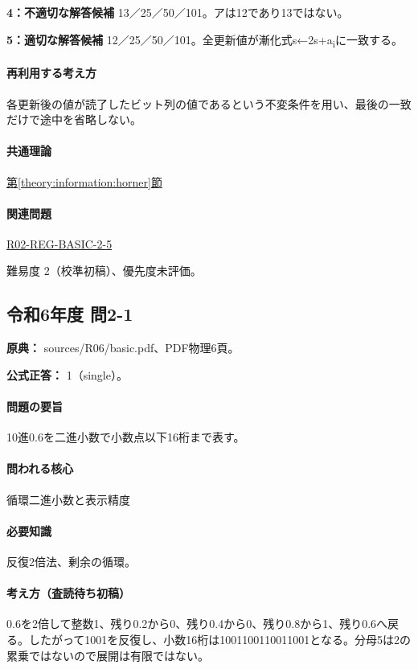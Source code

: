 \noindent\textbf{4：不適切な解答候補} 13／25／50／101。アは12であり13ではない。\par

\noindent\textbf{5：適切な解答候補} 12／25／50／101。全更新値が漸化式s←2s+a\textsubscript{i}に一致する。\par

\paragraph{再利用する考え方} 各更新後の値が読了したビット列の値であるという不変条件を用い、最後の一致だけで途中を省略しない。

\paragraph{共通理論} \hyperref[theory:information:horner]{第\ref*{theory:information:horner}節}

\paragraph{関連問題} \hyperref[q:r02-reg-basic-2-5]{R02-REG-BASIC-2-5}

\par 難易度 2（校準初稿）、優先度未評価。

\subsection{令和6年度 問2-1}
\label{q:r06-reg-basic-2-1}

\noindent\textbf{原典：} sources/R06/basic.pdf、PDF物理6頁。

\textbf{公式正答：} 1（single）。

\paragraph{問題の要旨} 10進0.6を二進小数で小数点以下16桁まで表す。

\paragraph{問われる核心} 循環二進小数と表示精度

\paragraph{必要知識} 反復2倍法、剰余の循環。

\paragraph{考え方（査読待ち初稿）} 0.6を2倍して整数1、残り0.2から0、残り0.4から0、残り0.8から1、残り0.6へ戻る。したがって1001を反復し、小数16桁は1001100110011001となる。分母5は2の累乗ではないので展開は有限ではない。

